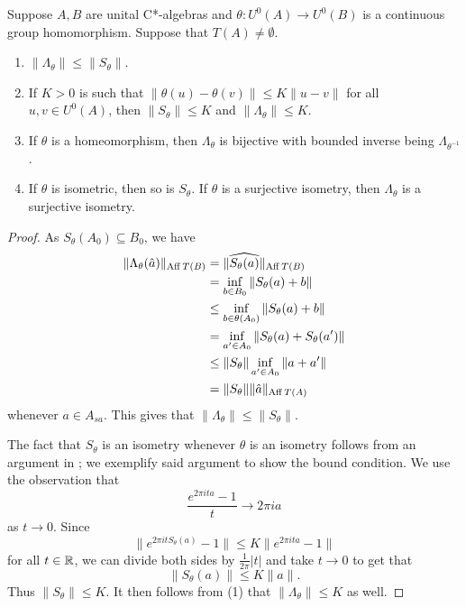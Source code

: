 \documentclass[12pt]{amsart}
\begin{document}
\begin{lemma}\label{lem:lipschitzSbounded}
Suppose $A,B$ are unital C*-algebras and $\theta: U^0(A) \to U^0(B)$ is a continuous group homomorphism. Suppose that $T(A) \neq \emptyset$.
\begin{enumerate}
\item $\|\Lambda_\theta\| \leq \|S_\theta\|$.
\item If $K > 0$ is such that $\|\theta(u) - \theta(v)\| \leq K\|u - v\|$ for all $u,v \in U^0(A)$, then $\|S_\theta\| \leq K$ and $\|\Lambda_\theta\| \leq K$.
\item If $\theta$ is a homeomorphism, then $\Lambda_\theta$ is bijective with bounded inverse being $\Lambda_{\theta^{-1}}$.
\item  If $\theta$ is isometric, then so is $S_\theta$.
If $\theta$ is a surjective isometry, then $\Lambda_\theta$ is a surjective isometry.
\end{enumerate}

\begin{proof}
As $S_\theta(A_0) \subseteq B_0$, we have
\begin{equation}
\begin{split}
\|\Lambda_\theta(\hat{a})\|_{\operatorname{Aff} T(B)} &= \|\widehat{S_\theta(a)}\|_{\operatorname{Aff} T(B)} \\
&= \inf_{b \in B_0} \|S_\theta(a) + b\| \\
&\leq \inf_{b \in \theta(A_0)} \|S_\theta(a) + b\| \\
&= \inf_{a' \in A_0} \|S_\theta(a) + S_\theta(a')\| \\
&\leq \|S_\theta\|\inf_{a' \in A_0}\|a + a'\| \\
&= \|S_\theta\|\|\hat{a}\|_{\operatorname{Aff} T(A)}
\end{split}
\end{equation}
whenever $a \in A_{sa}$. This gives that $\|\Lambda_\theta\| \leq \|S_\theta\|$.

The fact that $S_\theta$ is an isometry whenever $\theta$ is an isometry follows from an argument in \cite{HatoriMolnar14};  we exemplify said argument to show the bound condition. We use the observation that
\begin{equation}
\frac{e^{2\pi i t a} - 1}{t} \to 2\pi i a
\end{equation}
as $t \to 0$. Since
\begin{equation}
\|e^{2\pi i t S_\theta(a)} - 1\| \leq K\|e^{2\pi i t a} - 1\| 
\end{equation}
for all $t \in \mathbb{R}$, we can divide both sides by $\frac{1}{2\pi}|t|$ and take $t \to 0$ to get that
\begin{equation}
\|S_\theta(a)\| \leq K\|a\|.
\end{equation}
Thus $\|S_\theta\| \leq K$. It then follows from (1) that $\|\Lambda_\theta\| \leq K$ as well. 


\end{proof}
\end{lemma}
\end{document}
